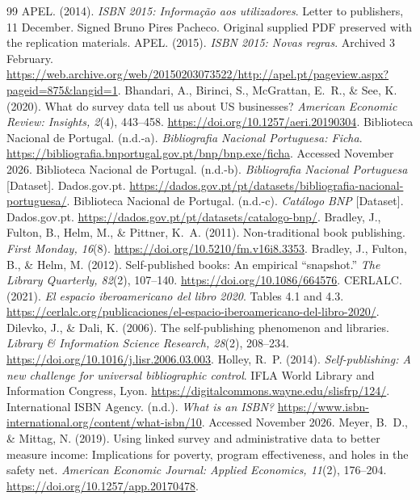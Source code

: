 \documentclass[11pt]{article}
\begin{document}
\clearpage
\begin{thebibliography}{99}
 APEL. (2014). \emph{ISBN 2015: Informa\c{c}\~ao aos utilizadores}. Letter to publishers, 11 December. Signed Bruno Pires Pacheco. Original supplied PDF preserved with the replication materials.
 APEL. (2015). \emph{ISBN 2015: Novas regras}. Archived 3 February. \url{https://web.archive.org/web/20150203073522/http://apel.pt/pageview.aspx?pageid=875&langid=1}.
 Bhandari, A., Birinci, S., McGrattan, E.~R., \& See, K. (2020). What do survey data tell us about US businesses? \emph{American Economic Review: Insights, 2}(4), 443--458. \url{https://doi.org/10.1257/aeri.20190304}.
 Biblioteca Nacional de Portugal. (n.d.-a). \emph{Bibliografia Nacional Portuguesa: Ficha}. \url{https://bibliografia.bnportugal.gov.pt/bnp/bnp.exe/ficha}. Accessed November 2026.
 Biblioteca Nacional de Portugal. (n.d.-b). \emph{Bibliografia Nacional Portuguesa} [Dataset]. Dados.gov.pt. \url{https://dados.gov.pt/pt/datasets/bibliografia-nacional-portuguesa/}.
 Biblioteca Nacional de Portugal. (n.d.-c). \emph{Cat\'alogo BNP} [Dataset]. Dados.gov.pt. \url{https://dados.gov.pt/pt/datasets/catalogo-bnp/}.
 Bradley, J., Fulton, B., Helm, M., \& Pittner, K.~A. (2011). Non-traditional book publishing. \emph{First Monday, 16}(8). \url{https://doi.org/10.5210/fm.v16i8.3353}.
 Bradley, J., Fulton, B., \& Helm, M. (2012). Self-published books: An empirical ``snapshot.'' \emph{The Library Quarterly, 82}(2), 107--140. \url{https://doi.org/10.1086/664576}.
 CERLALC. (2021). \emph{El espacio iberoamericano del libro 2020}. Tables 4.1 and 4.3. \url{https://cerlalc.org/publicaciones/el-espacio-iberoamericano-del-libro-2020/}.
 Dilevko, J., \& Dali, K. (2006). The self-publishing phenomenon and libraries. \emph{Library \& Information Science Research, 28}(2), 208--234. \url{https://doi.org/10.1016/j.lisr.2006.03.003}.
 Holley, R.~P. (2014). \emph{Self-publishing: A new challenge for universal bibliographic control}. IFLA World Library and Information Congress, Lyon. \url{https://digitalcommons.wayne.edu/slisfrp/124/}.
 International ISBN Agency. (n.d.). \emph{What is an ISBN?} \url{https://www.isbn-international.org/content/what-isbn/10}. Accessed November 2026.
 Meyer, B.~D., \& Mittag, N. (2019). Using linked survey and administrative data to better measure income: Implications for poverty, program effectiveness, and holes in the safety net. \emph{American Economic Journal: Applied Economics, 11}(2), 176--204. \url{https://doi.org/10.1257/app.20170478}.
\end{thebibliography}
\end{document}

